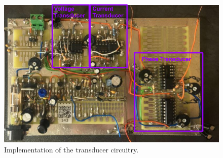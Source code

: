 \begin{figure}[!ht]
    \centering
  		\includegraphics[width=0.55\linewidth]{./Figures/trans_pcb.png}
		   \caption{Implementation of the transducer circuitry. } \label{subfig:trans_pcb}
     \end{figure}



